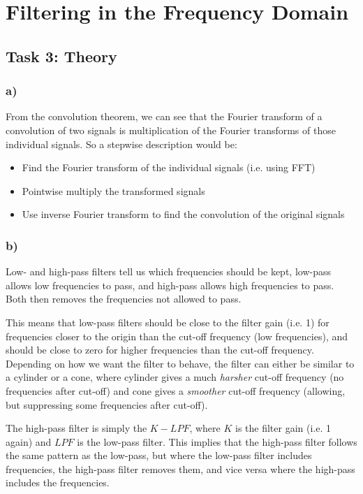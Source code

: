 \section{Filtering in the Frequency Domain}
\subsection{Task 3: Theory}
\subsubsection*{a)}
From the convolution theorem, we can see that the Fourier transform of a convolution of two signals is multiplication of the Fourier transforms of those individual signals. So a stepwise description would be: 
\begin{itemize}
    \item Find the Fourier transform of the individual signals (i.e. using FFT)
    \item Pointwise multiply the transformed signals
    \item Use inverse Fourier transform to find the convolution of the original signals
\end{itemize}

\subsubsection*{b)}
Low- and high-pass filters tell us which frequencies should be kept, low-pass allows low frequencies to pass, and high-pass allows high frequencies to pass. Both then removes the frequencies not allowed to pass. 

This means that low-pass filters should be close to the filter gain (i.e. 1) for frequencies closer to the origin than the cut-off frequency (low frequencies), and should be close to zero for higher frequencies than the cut-off frequency. Depending on how we want the filter to behave, the filter can either be similar to a cylinder or a cone, where cylinder gives a much \textit{harsher} cut-off frequency (no frequencies after cut-off) and cone gives a \textit{smoother} cut-off frequency (allowing, but suppressing some frequencies after cut-off). 

The high-pass filter is simply the $K - LPF$, where $K$ is the filter gain (i.e. 1 again) and $LPF$ is the low-pass filter. This implies that the high-pass filter follows the same pattern as the low-pass, but where the low-pass filter includes frequencies, the high-pass filter removes them, and vice versa where the high-pass includes the frequencies. 

